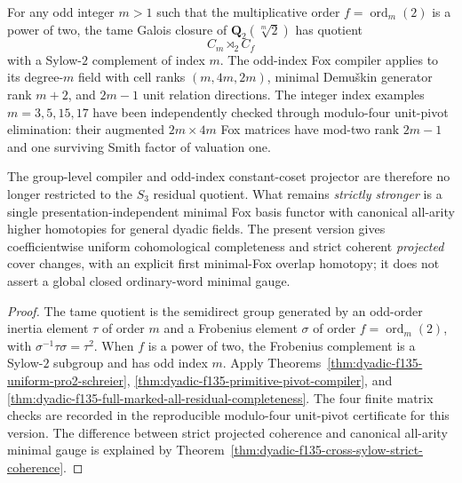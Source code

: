 \begin{corollary}
\label{cor:dyadic-f135-tame-indices-and-scope}
For any odd
integer $m>1$
such that
the multiplicative
order
$f=\operatorname{ord}_m(2)$
is a power of two,
the tame
Galois closure
of
$\mathbf Q_2(\sqrt[m]2)$
has quotient
\[
C_m\rtimes_2 C_f
\]
with a Sylow-$2$
complement of
index $m$.
The odd-index
Fox compiler
applies to its
degree-$m$
field with
cell ranks
$(m,4m,2m)$,
minimal Demu\v{s}kin
generator rank
$m+2$, and
$2m-1$
unit relation
directions.
The integer
index examples
$m=3,5,15,17$
have been
independently
checked through
modulo-four
unit-pivot
elimination:
their augmented
$2m\times4m$
Fox matrices
have mod-two
rank $2m-1$
and one surviving
Smith factor
of valuation one.

The group-level
compiler and
odd-index
constant-coset
projector are
therefore no
longer restricted
to the $S_3$
residual quotient.
What remains
\emph{strictly
stronger} is
a single
presentation-independent
minimal Fox
basis functor
with canonical
all-arity
higher homotopies
for general
dyadic fields.
The present
version gives
coefficientwise
uniform
cohomological
completeness
and strict
coherent
\emph{projected}
cover changes,
with an explicit
first
minimal-Fox
overlap homotopy;
it does not
assert a global
closed ordinary-word
minimal gauge.
\end{corollary}

\begin{proof}
The tame
quotient is the
semidirect
group generated
by an odd-order
inertia element
$\tau$ of order
$m$ and a
Frobenius element
$\sigma$ of
order
$f=\operatorname{ord}_m(2)$,
with
$\sigma^{-1}\tau
\sigma=\tau^2$.
When $f$ is a
power of two,
the Frobenius
complement is
a Sylow-$2$
subgroup and
has odd index $m$.
Apply
Theorems~\ref{thm:dyadic-f135-uniform-pro2-schreier},
\ref{thm:dyadic-f135-primitive-pivot-compiler},
and
\ref{thm:dyadic-f135-full-marked-all-residual-completeness}.
The four
finite matrix
checks are
recorded in the
reproducible
modulo-four
unit-pivot
certificate
for this
version.
The difference
between
strict projected
coherence and
canonical all-arity
minimal gauge
is explained by
Theorem~\ref{thm:dyadic-f135-cross-sylow-strict-coherence}.
\end{proof}

